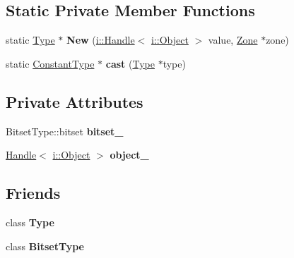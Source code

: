 \subsection*{Static Private Member Functions}
\begin{DoxyCompactItemize}
\item 
static \hyperlink{classv8_1_1internal_1_1_type}{Type} $\ast$ {\bfseries New} (\hyperlink{classv8_1_1internal_1_1_handle}{i\+::\+Handle}$<$ \hyperlink{classv8_1_1internal_1_1_object}{i\+::\+Object} $>$ value, \hyperlink{classv8_1_1internal_1_1_zone}{Zone} $\ast$zone)\hypertarget{classv8_1_1internal_1_1_constant_type_afada8d25ea117aaee7cd844875f3f9ee}{}\label{classv8_1_1internal_1_1_constant_type_afada8d25ea117aaee7cd844875f3f9ee}

\item 
static \hyperlink{classv8_1_1internal_1_1_constant_type}{Constant\+Type} $\ast$ {\bfseries cast} (\hyperlink{classv8_1_1internal_1_1_type}{Type} $\ast$type)\hypertarget{classv8_1_1internal_1_1_constant_type_a9b0e664e399811990b888783b5a86821}{}\label{classv8_1_1internal_1_1_constant_type_a9b0e664e399811990b888783b5a86821}

\end{DoxyCompactItemize}
\subsection*{Private Attributes}
\begin{DoxyCompactItemize}
\item 
Bitset\+Type\+::bitset {\bfseries bitset\+\_\+}\hypertarget{classv8_1_1internal_1_1_constant_type_a73363dfe1964873284619253b61ccfb7}{}\label{classv8_1_1internal_1_1_constant_type_a73363dfe1964873284619253b61ccfb7}

\item 
\hyperlink{classv8_1_1internal_1_1_handle}{Handle}$<$ \hyperlink{classv8_1_1internal_1_1_object}{i\+::\+Object} $>$ {\bfseries object\+\_\+}\hypertarget{classv8_1_1internal_1_1_constant_type_a2006d89e09f87845add47080caf8d5f3}{}\label{classv8_1_1internal_1_1_constant_type_a2006d89e09f87845add47080caf8d5f3}

\end{DoxyCompactItemize}
\subsection*{Friends}
\begin{DoxyCompactItemize}
\item 
class {\bfseries Type}\hypertarget{classv8_1_1internal_1_1_constant_type_a18dba29b4f3e91d6d2bc53472a6bb7cc}{}\label{classv8_1_1internal_1_1_constant_type_a18dba29b4f3e91d6d2bc53472a6bb7cc}

\item 
class {\bfseries Bitset\+Type}\hypertarget{classv8_1_1internal_1_1_constant_type_ae1bc4470107e0fde432ac5e20204635d}{}\label{classv8_1_1internal_1_1_constant_type_ae1bc4470107e0fde432ac5e20204635d}

\end{DoxyCompactItemize}
